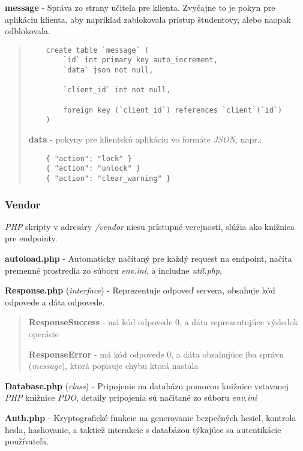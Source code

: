 \documentclass{article}
\newcommand{\filedesc}[1]{\vspace{0.3cm} \noindent \textbf{#1}}
\newcommand{\file}[1]{\emph{#1}}
\begin{document}
\filedesc{message} - Správa zo strany učiteľa pre klienta. Zvyčajne to je pokyn pre aplikáciu klienta, aby napríklad zablokovala prístup študentovy, alebo naopak odblokovala.

\begin{quote}
  \begin{verbatim}
    create table `message` (
        `id` int primary key auto_increment,
        `data` json not null,

        `client_id` int not null,

        foreign key (`client_id`) references `client`(`id`)
    )
  \end{verbatim}
  
  \filedesc{data} - pokyny pre klientskú aplikáciu vo formáte \emph{JSON}, napr.:

  \begin{verbatim}
    { "action": "lock" }
    { "action": "unlock" }
    { "action": "clear_warning" }
  \end{verbatim}

\end{quote}

\subsubsection{Vendor}


\emph{PHP} skripty v adresáry \file{/vendor} niesu prístupné verejnosti, slúžia ako knižnica pre endpointy.

\filedesc{autoload.php} - Automaticky načítaný pre každý request na endpoint, načíta premenné prostredia zo súboru \file{env.ini}, a includne \file{util.php}.

\filedesc{Response.php} (\emph{interface}) - Reprezentuje odpoveď servera, obsahuje kód odpovede a dáta odpovede.
\begin{quote}
  \filedesc{ResponseSuccess} - má kód odpovede 0, a dáta reprezentujúce výsledok operácie

  \filedesc{ResponseError} - má kód odpovede 0, a dáta obsahujúce iba správu (\emph{message}), ktorá popisuje chybu ktorá nastala
\end{quote}

\filedesc{Database.php} (\emph{class}) - Pripojenie na databázu pomocou knižnice vstavanej \emph{PHP} knižnice \emph{PDO}, detaily pripojenia sú načítané zo súboru \file{env.ini}

\filedesc{Auth.php} - Kryptografické funkcie na generovanie bezpečných hesiel, kontrola hesla, hashovanie, a taktiež interakcie s databázou týkajúce sa autentikácie používateľa.
\end{document}
